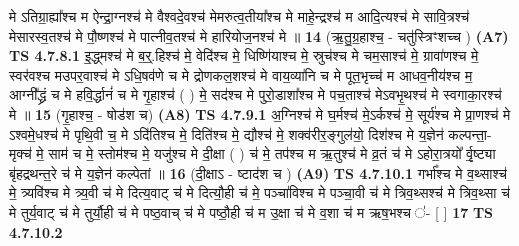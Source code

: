 \documentclass[17pt]{extarticle}
\begin{document}
                  मे ऽतिग्रा॒ह्या᳚श्च म ऐन्द्रा॒ग्नश्च॑ मे वैश्वदे॒वश्च॑ मेमरुत्व॒तीया᳚श्च मे माहे॒न्द्रश्च॑ म आदि॒त्यश्च॑ मे सावि॒त्रश्च॑ मेसारस्व॒तश्च॑ मे पौ॒ष्णश्च॑ मे पात्नीव॒तश्च॑ मे हारियोज॒नश्च॑ मे ॥ \textbf{  14} \newline
                  \newline
                      (ऋ॒तु॒ग्र॒हाश्च॒ - चतु॑स्त्रिꣳशच्च )  \textbf{(A7)} \newline \newline
                                        \textbf{ TS 4.7.8.1} \newline
                  इ॒द्ध्मश्च॑ मे ब॒र्॒.हिश्च॑ मे॒ वेदि॑श्च मे॒ धिष्णि॑याश्च मे॒ स्रुच॑श्च मे चम॒साश्च॑ मे॒ ग्रावा॑णश्च मे॒ स्वर॑वश्च मउपर॒वाश्च॑ मे ऽधि॒षव॑णे च मे द्रोणकल॒शश्च॑ मे वाय॒व्या॑नि च मे पूत॒भृच्च॑ म आधव॒नीय॑श्च म॒ आग्नी᳚द्ध्रं च मे हवि॒र्द्धानं॑ च मे गृ॒हाश्च॑ ( ) मे॒ सद॑श्च मे पुरो॒डाशा᳚श्च मे पच॒ताश्च॑ मेऽवभृ॒थश्च॑ मे स्वगाका॒रश्च॑ मे ॥ \textbf{  15} \newline
                  \newline
                      (गृ॒हाश्च॒ - षोड॑श च)  \textbf{(A8)} \newline \newline
                                        \textbf{ TS 4.7.9.1} \newline
                  अ॒ग्निश्च॑ मे घ॒र्मश्च॑ मे॒ऽर्कश्च॑ मे॒ सूर्य॑श्च मे प्रा॒णश्च॑ मे ऽश्वमे॒धश्च॑ मे पृथि॒वी च॒ मे ऽदि॑तिश्च मे॒ दिति॑श्च मे॒ द्यौश्च॑ मे॒ शक्व॑रीर॒ङ्गुल॑यो॒ दिश॑श्च मे     य॒ज्ञेन॑ कल्पन्ता॒- मृक्च॑ मे॒ साम॑ च मे॒ स्तोम॑श्च मे॒ यजु॑श्च मे दी॒क्षा ( ) च॑ मे॒ तप॑श्च म ऋ॒तुश्च॑ मे व्र॒तं च॑ मे ऽहोरा॒त्रयो᳚ र्वृ॒ष्ट्या बृ॑हद्रथन्त॒रे च॑ मे य॒ज्ञेन॑ कल्पेतां ॥ \textbf{  16 } \newline
                  \newline
                      (दी॒क्षाऽ - ष्टाद॑श च )  \textbf{(A9)} \newline \newline
                                        \textbf{ TS 4.7.10.1} \newline
                  गर्भा᳚श्च मे व॒थ्साश्च॑ मे॒ त्र्यवि॑श्च मे त्र्य॒वी च॑ मे दित्य॒वाट् च॑ मे दित्यौ॒ही च॑ मे॒ पञ्चा॑विश्च मे पञ्चा॒वी च॑ मे त्रिव॒थ्सश्च॑ मे त्रिव॒थ्सा च॑ मे तुर्य॒वाट् च॑ मे तुर्यौ॒ही च॑ मे पष्ठ॒वाच् च॑ मे पष्ठौ॒ही च॑ म उ॒क्षा च॑ मे व॒शा च॑ म ऋष॒भश्च ॑- [  ] \textbf{  17} \newline
                  \newline
                                \textbf{ TS 4.7.10.2} \newline
\end{document}
